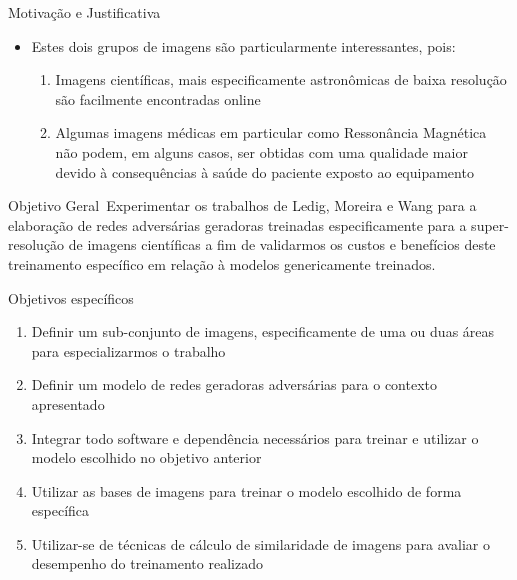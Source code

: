 \documentclass{beamer}
\begin{document}
    \begin{frame}{Motivação e Justificativa}{\thesection \, \secname}
        \begin{itemize}
            \item Estes dois grupos de imagens são particularmente interessantes, pois:
            \begin{enumerate}
                \item Imagens científicas, mais especificamente astronômicas de baixa resolução são facilmente encontradas online

                \item Algumas imagens médicas em particular como Ressonância Magnética não podem, em alguns casos, ser obtidas com uma qualidade maior devido à consequências à saúde do paciente exposto ao equipamento \cite{gupta_super-resolution_2020}
            \end{enumerate}
        \end{itemize}
    \end{frame}

    \begin{frame}{Objetivo Geral}{\thesection \, \secname}
        Experimentar os trabalhos de Ledig, Moreira e Wang  \cite{ledig_photo-realistic_2017, moreira_geracao_2019, wang_esrgan_2018} para a elaboração de redes adversárias geradoras treinadas especificamente para a super-resolução de imagens científicas a fim de validarmos os custos e benefícios deste treinamento específico em relação à modelos genericamente treinados.
    \end{frame}
    
    \begin{frame}{Objetivos específicos}{\thesection \, \secname}
        \begin{enumerate}
            \item Definir um sub-conjunto de imagens, especificamente de uma ou duas áreas para especializarmos o trabalho
        
            \item Definir um modelo de redes geradoras adversárias para o contexto apresentado
        	
            \item Integrar todo software e dependência necessários para treinar e utilizar o modelo escolhido no objetivo anterior
            
            \item Utilizar as bases de imagens para treinar o modelo escolhido de forma específica
        
            \item Utilizar-se de técnicas de cálculo de similaridade de imagens para avaliar o desempenho do treinamento realizado
        \end{enumerate}
    \end{frame}
\end{document}

